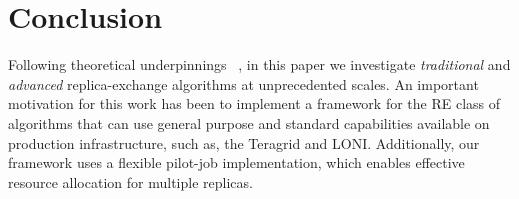 \documentclass{rspublic}
\newcommand{\alnote}[1]{ {\textcolor{blue} { ***andre: #1 }}}
\newcommand{\alnote}[1]{}
\begin{document}

\section{Conclusion}
\label{sec:conclusion}

Following theoretical underpinnings
~\citep{parashar_arepex,DBLP:journals/jcc/GallicchioLP08}, in this
paper we investigate {\it traditional} and {\it advanced}
replica-exchange algorithms at unprecedented scales.  An important
motivation for this work has been to implement a framework for the RE
class of algorithms that can use general purpose and standard
capabilities available on production infrastructure, such as, the
Teragrid and LONI.  Additionally, our framework uses a flexible
pilot-job implementation, which enables effective resource allocation
for multiple replicas.
\end{document}

